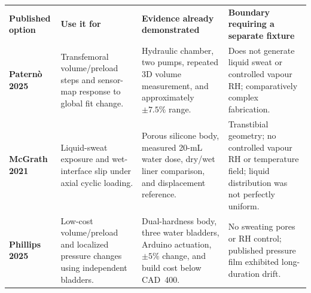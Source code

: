 \vspace{0.55em}

\begingroup
\fontsize{7.85}{9.15}\selectfont
\setlength{\tabcolsep}{2.5pt}
\renewcommand{\arraystretch}{1.09}
\begin{tabularx}{\linewidth}{>{\bfseries\color{AUBRed}}p{2.25cm}Y Y Y}
\color{white}\textbf{Published option} & \color{white}\textbf{Use it for} &
\color{white}\textbf{Evidence already demonstrated} &
\color{white}\textbf{Boundary requiring a separate fixture} \\
Patern\`o 2025 & Transfemoral volume/preload steps and sensor-map response to
global fit change. & Hydraulic chamber, two pumps, repeated 3D volume
measurement, and approximately $\pm7.5\%$ range. & Does not generate liquid
sweat or controlled vapour RH; comparatively complex fabrication. \\
McGrath 2021 & Liquid-sweat exposure and wet-interface slip under axial cyclic
loading. & Porous silicone body, measured 20-mL water dose, dry/wet liner
comparison, and displacement reference. & Transtibial geometry; no controlled
vapour RH or temperature field; liquid distribution was not perfectly uniform. \\
Phillips 2025 & Low-cost volume/preload and localized pressure changes using
independent bladders. & Dual-hardness body, three water bladders, Arduino
actuation, $\pm5\%$ change, and build cost below CAD~400. & No sweating pores or
RH control; published pressure film exhibited long-duration drift. \\
\end{tabularx}
\endgroup
{}

\vspace{0.35em}

